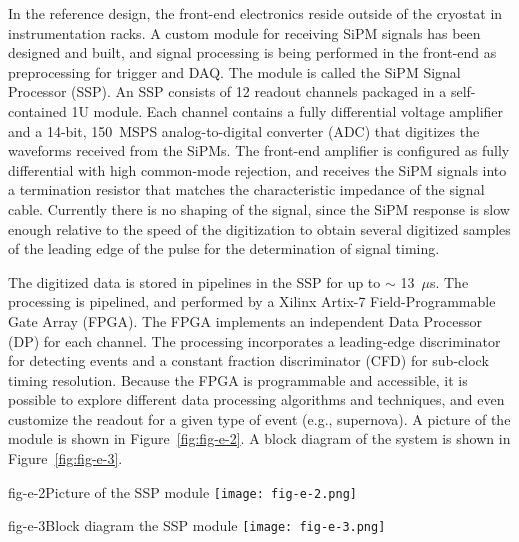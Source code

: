 In the reference design, the front-end electronics reside outside of the
cryostat in instrumentation racks.   A
custom module for receiving SiPM signals has been designed and built, and signal
processing is being performed in the front-end as preprocessing for trigger and DAQ.  The
module is called the SiPM Signal Processor (SSP).  An SSP consists of
12 readout channels packaged in a self-contained 1U module.  Each
channel contains a fully differential voltage amplifier and a 14-bit,
150~MSPS analog-to-digital converter (ADC) that digitizes the
waveforms received from the SiPMs.  The front-end amplifier is
configured as fully differential with high common-mode rejection, and
receives the SiPM signals into a termination resistor that matches the
characteristic impedance of the signal cable.  Currently there is no
shaping of the signal, since the SiPM response is slow enough relative
to the speed of the digitization to obtain several digitized samples
of the leading edge of the pulse for the determination of signal
timing.

The digitized data is stored in pipelines in the SSP for up to $\sim$
13~$\mu$s.  The processing is pipelined, and performed by a Xilinx
Artix-7 Field-Programmable Gate Array (FPGA).  The FPGA implements an
independent Data Processor (DP) for each channel.  The processing
incorporates a leading-edge discriminator for detecting events and a
constant fraction discriminator (CFD) for sub-clock timing resolution.
Because the FPGA is programmable and accessible, it is possible to
explore different data processing algorithms and techniques, and even
customize the readout for a given type of event (e.g., supernova).  A picture of the module is shown in Figure~\ref{fig:fig-e-2}.
A block diagram of the system is shown in Figure~\ref{fig:fig-e-3}.

\begin{cdrfigure}{fig-e-2}{Picture of the SSP module}
\texttt{[image: fig-e-2.png]}
\end{cdrfigure}

\begin{cdrfigure}{fig-e-3}{Block diagram the SSP module}
\texttt{[image: fig-e-3.png]}
\end{cdrfigure}

